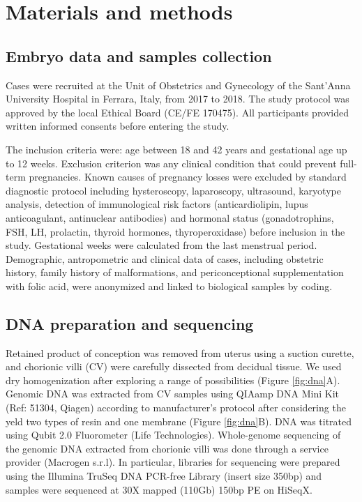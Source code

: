 \section*{Materials and methods}

\subsection*{Embryo data and samples collection}
Cases were recruited at the Unit of Obstetrics and Gynecology of the Sant’Anna University Hospital in Ferrara, Italy, from 2017 to 2018. The study protocol was approved by the local Ethical Board (CE/FE 170475). All participants provided written informed consents before entering the study.

The inclusion criteria were: age between 18 and 42 years and gestational age up to 12 weeks. Exclusion criterion was any clinical condition that could prevent full-term pregnancies. Known causes of pregnancy losses were excluded by standard diagnostic protocol including hysteroscopy, laparoscopy, ultrasound, karyotype analysis, detection of immunological risk factors (anticardiolipin, lupus anticoagulant, antinuclear antibodies) and hormonal status (gonadotrophins, FSH, LH, prolactin, thyroid hormones, thyroperoxidase) before inclusion in the study. Gestational weeks were calculated from the last menstrual period. Demographic, antropometric and clinical data of cases, including obstetric history, family history of malformations, and periconceptional supplementation with folic acid, were anonymized and linked to biological samples by coding. 


\subsection*{DNA preparation and sequencing} 
Retained product of conception was removed from uterus using a suction curette, and chorionic villi (CV) were carefully dissected from decidual tissue. We used dry homogenization after exploring a range of possibilities (Figure \ref{fig:dna}A). 
Genomic DNA was extracted from CV samples using QIAamp DNA Mini Kit (Ref: 51304, Qiagen) according to manufacturer’s protocol after considering the yeld two types of resin and one membrane (Figure \ref{fig:dna}B). DNA was titrated using Qubit 2.0 Fluorometer (Life Technologies).
Whole-genome sequencing of the genomic DNA extracted from chorionic villi was done through a service provider (Macrogen s.r.l). In particular, libraries for sequencing were prepared using the Illumina TruSeq DNA PCR-free Library (insert size 350bp) and samples were sequenced at 30X mapped (110Gb) 150bp PE on HiSeqX. 

